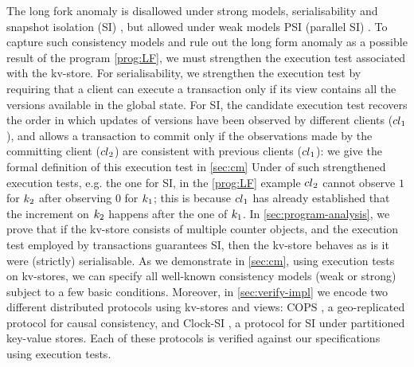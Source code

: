 The long fork anomaly is disallowed under strong models, \eg serialisability and snapshot isolation 
(SI) \cite{fekete-tods}, 
but allowed under weak models \eg PSI (parallel SI) \cite{PSI}. 
%
To capture such consistency models and rule out the long form anomaly as a possible result 
of the program \eqref{prog:LF}, we must strengthen the execution test associated with the kv-store. 
For serialisability, we strengthen the execution test by requiring that a client can execute a transaction 
only if its view contains all the versions available in the global state. 
For SI, 
the candidate execution test recovers the order in which 
updates of versions have been observed by different clients (\eg ${cl}_1$), 
and allows a transaction to commit only if the observations made by the committing client (\eg ${cl}_2$) 
are consistent with previous clients (\ie ${cl}_1$): we give the formal definition of this execution test 
in \cref{sec:cm}
Under of such strengthened execution tests, e.g. the one for SI, in the \eqref{prog:LF} example ${cl}_2$ cannot
observe $1$ for $k_2$ after observing $0$ for $k_1$; 
this is because ${cl}_1$ has already established that the increment on $k_2$ happens after 
the one of $k_1$. 
In \cref{sec:program-analysis}, we prove that if the kv-store consists of multiple counter objects, and the execution test employed by transactions guarantees SI, then the kv-store 
behaves as is it were (strictly) serialisable.
%
As we demonstrate in \cref{sec:cm}, using execution tests on kv-stores, we can specify all well-known consistency models (weak or strong) subject to a few basic conditions. 
%
Moreover, in \cref{sec:verify-impl} we encode two different distributed protocols using kv-stores and views: COPS \cite{cops}, 
a geo-replicated protocol for causal consistency, and Clock-SI \cite{clocksi}, a protocol for SI under partitioned key-value stores.
Each of these protocols is verified against our specifications using execution tests.
